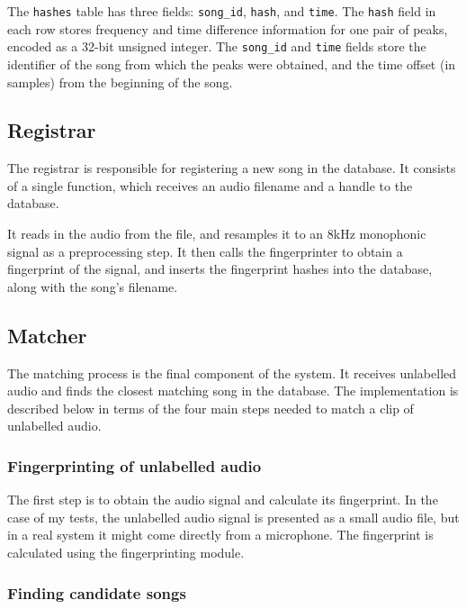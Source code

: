 \documentclass[12pt,a4paper,twoside,openright]{report}
\begin{document}
The \lstinline{hashes} table has three fields: \lstinline{song_id}, \lstinline{hash}, and \lstinline{time}. The \lstinline{hash} field in each row stores frequency and time difference information for one pair of peaks, encoded as a 32-bit unsigned integer. The \lstinline{song_id} and \lstinline{time} fields store the identifier of the song from which the peaks were obtained, and the time offset (in samples) from the beginning of the song.


\subsection{Registrar}
\label{shazam:registrar}

The registrar is responsible for registering a new song in the database. It consists of a single function, which receives an audio filename and a handle to the database. 

It reads in the audio from the file, and resamples it to an 8kHz monophonic signal as a preprocessing step. It then calls the fingerprinter to obtain a fingerprint of the signal, and inserts the fingerprint hashes into the database, along with the song's filename.


\subsection{Matcher}
\label{shazam:matcher}

The matching process is the final component of the system. It receives unlabelled audio and finds the closest matching song in the database. The implementation is described below in terms of the four main steps needed to match a clip of unlabelled audio.

\subsubsection{Fingerprinting of unlabelled audio}

The first step is to obtain the audio signal and calculate its fingerprint. In the case of my tests, the unlabelled audio signal is presented as a small audio file, but in a real system it might come directly from a microphone. The fingerprint is calculated using the fingerprinting module.

\subsubsection{Finding candidate songs}
\end{document}
